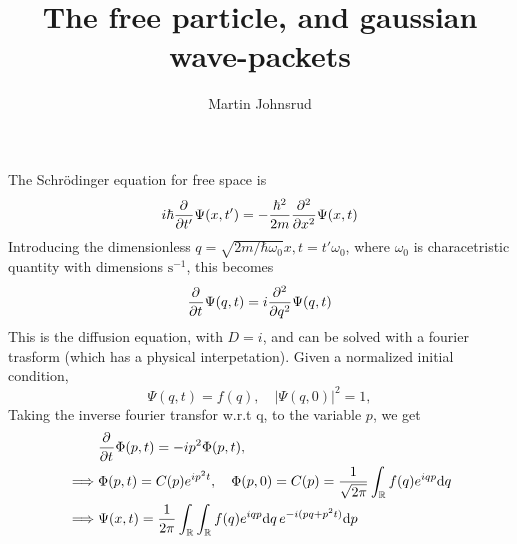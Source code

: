 \documentclass{article}
\author{Martin Johnsrud}
\title{The free particle, and gaussian wave-packets}
\begin{document}
    \maketitle

    The Schrödinger equation for free space is
    $$
        i \hbar \del[t'] \Psi(x, t') = - \frac{\hbar^2}{2m} \del[x]2 \Psi(x, t)
    $$
    Introducing the dimensionless $q = \sqrt{2 m / \hbar \omega_0} x, t = t' \omega_0$, where $\omega_0$ is characetristic quantity with dimensions $\mathrm{s^{-1}}$, this becomes
    \begin{equation}
        \del[t] \Psi(q, t) = i \del[q]2 \Psi(q, t)
    \end{equation}
    This is the diffusion equation, with $D = i$, and can be solved with a fourier trasform (which has a physical interpetation). Given a normalized initial condition,
    $$
        \Psi(q, t) = f(q), \quad |\Psi(q, 0)|^2 = 1, 
    $$
    Taking the inverse fourier transfor w.r.t q, to the variable $p$, we get
    \begin{align*}
        & \del[t] \Phi(p, t) = -i p^2 \Phi(p, t), \\
        \implies & \Phi(p, t) = C(p) e^{ip^2t}, \quad\Phi(p, 0) = C(p) = \frac{1}{\sqrt{2 \pi}}\int_{\mathbb{R}} f(q) e^{iqp} \mathrm{d}q \\
        \implies & \Psi(x, t) = \frac{1}{2 \pi} \int_{\mathbb{R}} \int_{\mathbb{R}} f(q) e^{iqp} \mathrm{d}q \, e^{-i(pq + p^2t)} \mathrm{d}p
    \end{align*}
\end{document}
